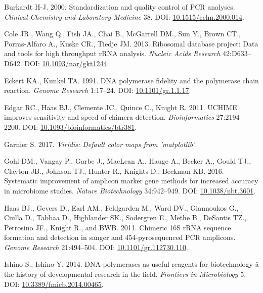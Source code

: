 \documentclass[11pt,]{article}
\begin{document}
\hypertarget{ref-Burkardt2000}{}
Burkardt H-J. 2000. Standardization and quality control of PCR analyses.
\emph{Clinical Chemistry and Laboratory Medicine} 38. DOI:
\href{https://doi.org/10.1515/cclm.2000.014}{10.1515/cclm.2000.014}.

\hypertarget{ref-rdp_Cole_2013}{}
Cole JR., Wang Q., Fish JA., Chai B., McGarrell DM., Sun Y., Brown CT.,
Porras-Alfaro A., Kuske CR., Tiedje JM. 2013. Ribosomal database
project: Data and tools for high throughput rRNA analysis. \emph{Nucleic
Acids Research} 42:D633--D642. DOI:
\href{https://doi.org/10.1093/nar/gkt1244}{10.1093/nar/gkt1244}.

\hypertarget{ref-Eckert1991}{}
Eckert KA., Kunkel TA. 1991. DNA polymerase fidelity and the polymerase
chain reaction. \emph{Genome Research} 1:17--24. DOI:
\href{https://doi.org/10.1101/gr.1.1.17}{10.1101/gr.1.1.17}.

\hypertarget{ref-uchime_Edgar_2011}{}
Edgar RC., Haas BJ., Clemente JC., Quince C., Knight R. 2011. UCHIME
improves sensitivity and speed of chimera detection.
\emph{Bioinformatics} 27:2194--2200. DOI:
\href{https://doi.org/10.1093/bioinformatics/btr381}{10.1093/bioinformatics/btr381}.

\hypertarget{ref-viridis_citation_2017}{}
Garnier S. 2017. \emph{Viridis: Default color maps from 'matplotlib'}.

\hypertarget{ref-taq_Gohl_2016}{}
Gohl DM., Vangay P., Garbe J., MacLean A., Hauge A., Becker A., Gould
TJ., Clayton JB., Johnson TJ., Hunter R., Knights D., Beckman KB. 2016.
Systematic improvement of amplicon marker gene methods for increased
accuracy in microbiome studies. \emph{Nature Biotechnology} 34:942--949.
DOI: \href{https://doi.org/10.1038/nbt.3601}{10.1038/nbt.3601}.

\hypertarget{ref-Haas2011}{}
Haas BJ., Gevers D., Earl AM., Feldgarden M., Ward DV., Giannoukos G.,
Ciulla D., Tabbaa D., Highlander SK., Sodergren E., Methe B., DeSantis
TZ., Petrosino JF., Knight R., and BWB. 2011. Chimeric 16S rRNA sequence
formation and detection in sanger and 454-pyrosequenced PCR amplicons.
\emph{Genome Research} 21:494--504. DOI:
\href{https://doi.org/10.1101/gr.112730.110}{10.1101/gr.112730.110}.

\hypertarget{ref-polymerase_Ishino_2014}{}
Ishino S., Ishino Y. 2014. DNA polymerases as useful reagents for
biotechnology â the history of developmental research in the field.
\emph{Frontiers in Microbiology} 5. DOI:
\href{https://doi.org/10.3389/fmicb.2014.00465}{10.3389/fmicb.2014.00465}.
\end{document}
